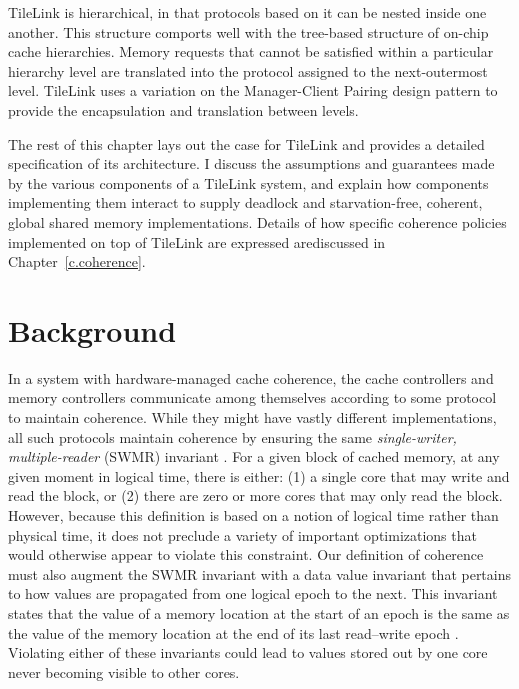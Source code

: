 TileLink is hierarchical, in that protocols based on it can be nested inside one another.
This structure comports well with the tree-based structure of on-chip cache hierarchies.
Memory requests that cannot be satisfied within a particular hierarchy level are translated into the protocol assigned to the next-outermost level. 
TileLink uses a variation on the Manager-Client Pairing design pattern to provide the encapsulation and translation between levels.

The rest of this chapter lays out the case for TileLink and provides a detailed specification of its architecture.
I discuss the assumptions and guarantees made by the various components of a TileLink system, and explain how components implementing them interact
to supply deadlock and starvation-free, coherent, global shared memory implementations.
Details of how specific coherence policies implemented on top of TileLink are expressed arediscussed in Chapter~\ref{c.coherence}.

\section{Background}

In a system with hardware-managed cache coherence, the cache controllers and memory controllers
communicate among themselves according to some protocol to maintain coherence.
While they might have vastly different implementations, 
all such protocols maintain coherence by ensuring the same {\em single-writer, multiple-reader} (SWMR) invariant \cite{sorin2011primer}. 
For a given block of cached memory, at any given moment in logical time, there is either: 
(1) a single core that may write and read the block, or 
(2) there are zero or more cores that may only read the block.
However, because this definition is based on a notion of logical time rather than physical time,
it does not preclude a variety of important optimizations that would otherwise appear to violate this constraint.
Our definition of coherence must also augment the SWMR invariant with a data value invariant
that pertains to how values are propagated from one logical epoch to the next.
This invariant states that the value of a memory location at the start of an epoch
is the same as the value of the memory location at the end of its last read–write epoch \cite{sorin2011primer}.
Violating either of these invariants could lead to values stored out by one core never becoming visible to other cores.

